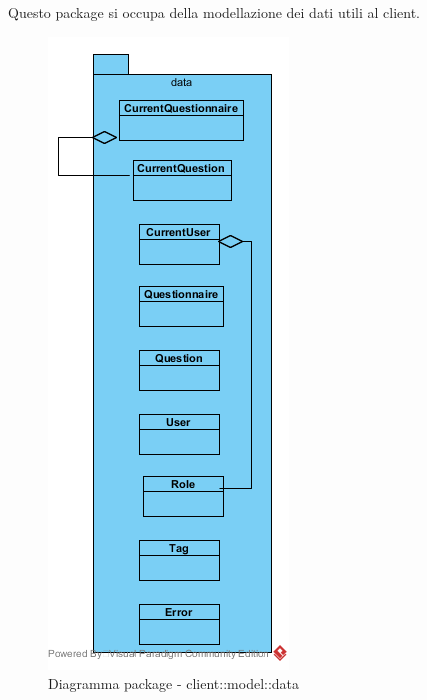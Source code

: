 Questo package si occupa della modellazione dei dati utili al client.\begin{center}
	\begin{figure}[H]
		\centering \includegraphics[scale=4, max width=\textwidth, max height=\myheight]{../img/diagrammiClassi/client/model/data.png}
		\caption{Diagramma package - client::model::data}
	\end{figure}
\end{center}\hypertarget{client::model::data::Questionnaire}{}
